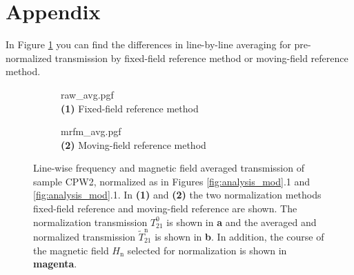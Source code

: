 \chapter*{Appendix}



In Figure \ref{fig:analysis_mod_avg} you can find the differences in line-by-line averaging for pre-normalized transmission by fixed-field reference method or moving-field reference method.
\begin{figure}
     \centering
     \begin{turn}{90}
     \begin{subfigure}[b]{4in}
         \centering
         {raw_avg.pgf}\\
         \centering\small\textbf{(1)} Fixed-field reference method\\
     \end{subfigure}
     \end{turn}
     \hspace{.2in}
     \begin{turn}{90}
     \begin{subfigure}[b]{4in}
         \centering
         {mrfm_avg.pgf}\\
         \centering\small\textbf{(2)} Moving-field reference method\\
     \end{subfigure}
     \end{turn}
    \caption[Averaged transmission of different normalized data of sample CPW2]{Line-wise frequency and magnetic field averaged transmission of sample CPW2, normalized as in Figures \ref{fig:analysis_mod}.1 and \ref{fig:analysis_mod}.1. In \textbf{(1)} and \textbf{(2)} the two normalization methods fixed-field reference and moving-field reference are shown. The normalization transmission $T_{21}^0$ is shown in \textbf{\color{antiseeblau100}a} and the averaged and normalized transmission $\widetilde{T}_{21}^\text{n}$ is shown in \textbf{\color{antiseeblau100}b}. In addition, the course of the magnetic field ${H}_\text{n}$ selected for normalization is shown in \textbf{\color{antiseeblau100}magenta}.}
    \label{fig:analysis_mod_avg}
\end{figure}

